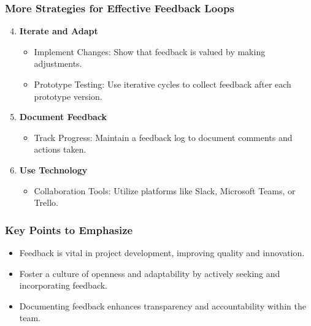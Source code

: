 \documentclass[aspectratio=169]{beamer}
\begin{document}
\begin{frame}[fragile]
    \frametitle{More Strategies for Effective Feedback Loops}
    \begin{enumerate}
        \setcounter{enumi}{3} %
        \item \textbf{Iterate and Adapt}
            \begin{itemize}
                \item Implement Changes: Show that feedback is valued by making adjustments.
                \item Prototype Testing: Use iterative cycles to collect feedback after each prototype version.
            \end{itemize}
        \item \textbf{Document Feedback}
            \begin{itemize}
                \item Track Progress: Maintain a feedback log to document comments and actions taken.
            \end{itemize}
        \item \textbf{Use Technology}
            \begin{itemize}
                \item Collaboration Tools: Utilize platforms like Slack, Microsoft Teams, or Trello.
            \end{itemize}
    \end{enumerate}
\end{frame}

\begin{frame}[fragile]
    \frametitle{Key Points to Emphasize}
    \begin{itemize}
        \item Feedback is vital in project development, improving quality and innovation.
        \item Foster a culture of openness and adaptability by actively seeking and incorporating feedback.
        \item Documenting feedback enhances transparency and accountability within the team.
    \end{itemize}
\end{frame}
\end{document}
